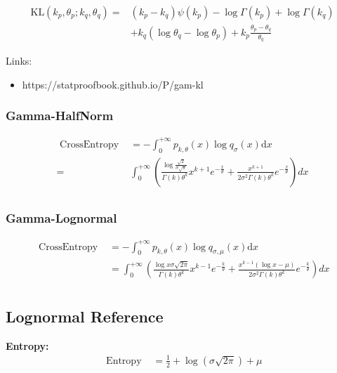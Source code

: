 \documentclass{article}
\begin{document}
$$ \begin{aligned} \mathrm{KL}\left(k_{p}, \theta_{p} ; k_{q}, \theta_{q}\right)=&\left(k_{p}-k_{q}\right) \psi\left(k_{p}\right)-\log \Gamma\left(k_{p}\right)+\log \Gamma\left(k_{q}\right) \\
&+k_{q}\left(\log \theta_{q}-\log \theta_{p}\right)+k_{p} \frac{\theta_{p}-\theta_{q}}{\theta_{q}}\end{aligned} $$


Links:
\begin{itemize}
    \item https://statproofbook.github.io/P/gam-kl
\end{itemize}

\subsubsection{Gamma-HalfNorm}

$$ \begin{aligned} \text { CrossEntropy }&=-\int_{0}^{+\infty} p_{k, \theta}(x) \log q_{\sigma}(x) \mathrm{d} x \\
=&\int_{0}^{+\infty } (\frac{\log\frac{\sqrt{2}}{\sigma{\sqrt{\pi}}} }{\Gamma (k)\theta^{k}} x^{k+1}e^{-\frac{x}{\theta}}+\frac{x^{k+1}}{2\sigma^{2}\Gamma (k)\theta^{k}}e^{-\frac{x}{\theta} })dx\\
\end{aligned} $$
\subsubsection{Gamma-Lognormal}
$$ \begin{aligned} \text { CrossEntropy }&=-\int_{0}^{+\infty} p_{k, \theta}(x) \log q_{\sigma,\mu}(x) \mathrm{d} x \\
&=\int_{0}^{+\infty } (\frac{\log x\sigma\sqrt{2\pi} }{\Gamma(k)\theta^{k}} x^{k-1}e^{-\frac{k}{\theta} }+\frac{x^{k-1}(\log x-\mu)}{2\sigma^{2}\Gamma(k)\theta^{k}}e^{-\frac{k}{\theta} })dx\\
\end{aligned} $$

\subsection{Lognormal Reference}

\noindent \textbf{Entropy:}
$$ \begin{aligned} \text { Entropy }&=\frac{1}{2}+\log (\sigma \sqrt{2 \pi})+\mu
\end{aligned} $$
\end{document}
